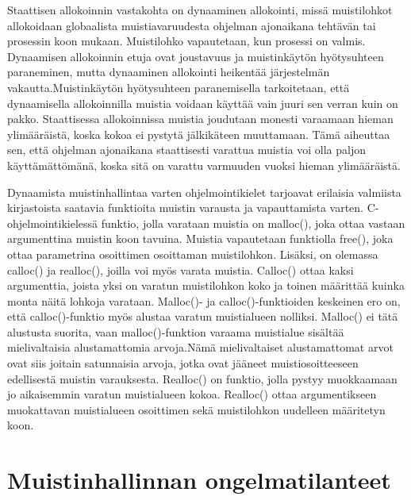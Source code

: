 Staattisen allokoinnin vastakohta on dynaaminen allokointi, missä muistilohkot allokoidaan globaalista muistiavaruudesta ohjelman ajonaikana tehtävän tai prosessin koon mukaan. Muistilohko vapautetaan, kun prosessi on valmis. Dynaamisen allokoinnin etuja ovat joustavuus ja muistinkäytön hyötysuhteen paraneminen, mutta dynaaminen allokointi heikentää järjestelmän vakautta.\cite{daroemmfera@2006}Muistinkäytön hyötysuhteen paranemisella tarkoitetaan, että dynaamisella allokoinnilla muistia voidaan käyttää vain juuri sen verran kuin on pakko. Staattisessa allokoinnissa muistia joudutaan monesti varaamaan hieman ylimääräistä, koska kokoa ei pystytä jälkikäteen muuttamaan. Tämä aiheuttaa sen, että ohjelman ajonaikana staattisesti varattua muistia voi olla paljon käyttämättömänä, koska sitä on varattu varmuuden vuoksi hieman ylimääräistä.

Dynaamista muistinhallintaa varten ohjelmointikielet tarjoavat erilaisia valmiista kirjastoista saatavia funktioita muistin varausta ja vapauttamista varten. C-ohjelmointikielessä funktio, jolla varataan muistia on malloc(), joka ottaa vastaan argumenttina muistin koon tavuina. Muistia vapautetaan funktiolla free(), joka ottaa parametrina osoittimen osoittaman muistilohkon. Lisäksi, on olemassa calloc() ja realloc(), joilla voi myös varata muistia. Calloc() ottaa kaksi argumenttia, joista yksi on varatun muistilohkon koko ja toinen määrittää kuinka monta näitä lohkoja varataan. Malloc()- ja calloc()-funktioiden keskeinen ero on, että calloc()-funktio myös alustaa varatun muistialueen nolliksi. Malloc() ei tätä alustusta suorita, vaan malloc()-funktion varaama muistialue sisältää mielivaltaisia alustamattomia arvoja.\cite{c2015book}Nämä mielivaltaiset alustamattomat arvot ovat siis joitain satunnaisia arvoja, jotka ovat jääneet muistiosoitteeseen edellisestä muistin varauksesta. Realloc() on funktio, jolla pystyy muokkaamaan jo aikaisemmin varatun muistialueen kokoa. Realloc() ottaa argumentikseen muokattavan muistialueen osoittimen sekä muistilohkon uudelleen määritetyn koon.\cite{c2015book}

\section{Muistinhallinnan ongelmatilanteet}

